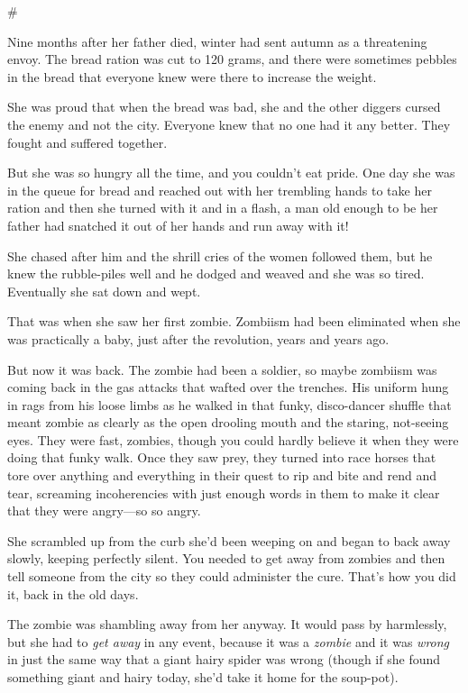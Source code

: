 \#

Nine months after her father died, winter had sent autumn as a
threatening envoy. The bread ration was cut to 120 grams, and there
were sometimes pebbles in the bread that everyone knew were there
to increase the weight.

She was proud that when the bread was bad, she and the other
diggers cursed the enemy and not the city. Everyone knew that no
one had it any better. They fought and suffered together.

But she was so hungry all the time, and you couldn’t eat pride. One
day she was in the queue for bread and reached out with her
trembling hands to take her ration and then she turned with it and
in a flash, a man old enough to be her father had snatched it out
of her hands and run away with it!

She chased after him and the shrill cries of the women followed
them, but he knew the rubble-piles well and he dodged and weaved
and she was so tired. Eventually she sat down and wept.

That was when she saw her first zombie. Zombiism had been
eliminated when she was practically a baby, just after the
revolution, years and years ago.

But now it was back. The zombie had been a soldier, so maybe
zombiism was coming back in the gas attacks that wafted over the
trenches. His uniform hung in rags from his loose limbs as he
walked in that funky, disco-dancer shuffle that meant zombie as
clearly as the open drooling mouth and the staring, not-seeing
eyes. They were fast, zombies, though you could hardly believe it
when they were doing that funky walk. Once they saw prey, they
turned into race horses that tore over anything and everything in
their quest to rip and bite and rend and tear, screaming
incoherencies with just enough words in them to make it clear that
they were angry—so so angry.

She scrambled up from the curb she’d been weeping on and began to
back away slowly, keeping perfectly silent. You needed to get away
from zombies and then tell someone from the city so they could
administer the cure. That’s how you did it, back in the old days.

The zombie was shambling away from her anyway. It would pass by
harmlessly, but she had to \emph{get away} in any event, because it
was a \emph{zombie} and it was \emph{wrong} in just the same way
that a giant hairy spider was wrong (though if she found something
giant and hairy today, she’d take it home for the soup-pot).

